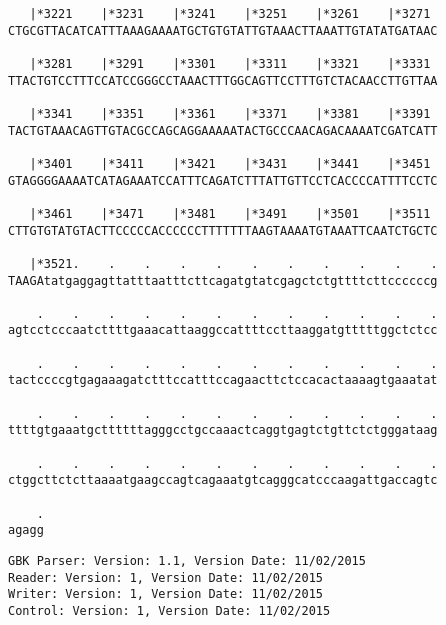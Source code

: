 \documentclass{article}
\begin{document}
\begin{Verbatim}
   |*3221    |*3231    |*3241    |*3251    |*3261    |*3271 
CTGCGTTACATCATTTAAAGAAAATGCTGTGTATTGTAAACTTAAATTGTATATGATAAC
  
   |*3281    |*3291    |*3301    |*3311    |*3321    |*3331 
TTACTGTCCTTTCCATCCGGGCCTAAACTTTGGCAGTTCCTTTGTCTACAACCTTGTTAA
  
   |*3341    |*3351    |*3361    |*3371    |*3381    |*3391 
TACTGTAAACAGTTGTACGCCAGCAGGAAAAATACTGCCCAACAGACAAAATCGATCATT
  
   |*3401    |*3411    |*3421    |*3431    |*3441    |*3451 
GTAGGGGAAAATCATAGAAATCCATTTCAGATCTTTATTGTTCCTCACCCCATTTTCCTC
  
   |*3461    |*3471    |*3481    |*3491    |*3501    |*3511 
CTTGTGTATGTACTTCCCCCACCCCCCTTTTTTTAAGTAAAATGTAAATTCAATCTGCTC
  
   |*3521.    .    .    .    .    .    .    .    .    .    .
TAAGAtatgaggagttatttaatttcttcagatgtatcgagctctgttttcttccccccg
  
    .    .    .    .    .    .    .    .    .    .    .    .
agtcctcccaatcttttgaaacattaaggccattttccttaaggatgtttttggctctcc
  
    .    .    .    .    .    .    .    .    .    .    .    .
tactccccgtgagaaagatctttccatttccagaacttctccacactaaaagtgaaatat
  
    .    .    .    .    .    .    .    .    .    .    .    .
ttttgtgaaatgcttttttagggcctgccaaactcaggtgagtctgttctctgggataag
  
    .    .    .    .    .    .    .    .    .    .    .    .
ctggcttctcttaaaatgaagccagtcagaaatgtcagggcatcccaagattgaccagtc
  
    .
agagg
\end{Verbatim}
\newpage
\begin{Verbatim}
GBK Parser: Version: 1.1, Version Date: 11/02/2015
Reader: Version: 1, Version Date: 11/02/2015
Writer: Version: 1, Version Date: 11/02/2015
Control: Version: 1, Version Date: 11/02/2015
\end{Verbatim}
\end{document}
